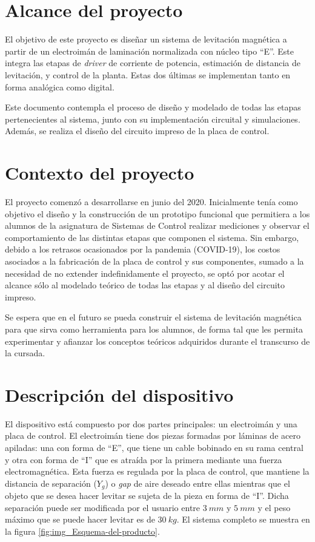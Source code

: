 \section{Alcance del proyecto}

\noindent El objetivo de este proyecto es diseñar un sistema de levitación magnética a partir de un electroimán de laminación normalizada con núcleo tipo “E''. Este integra las etapas de \textsl{driver} de corriente de potencia, estimación de distancia de levitación, y control de la planta. Estas dos últimas se implementan tanto en forma analógica como digital.

\noindent Este documento contempla el proceso de diseño y modelado de todas las etapas pertenecientes al sistema, junto con su implementación circuital y simulaciones. Además, se realiza el diseño del circuito impreso de la placa de control.



\section{Contexto del proyecto}

\noindent El proyecto comenzó a desarrollarse en junio del 2020. Inicialmente tenía como objetivo el diseño y la construcción de un prototipo funcional que permitiera a los alumnos de la asignatura de Sistemas de Control realizar mediciones y observar el comportamiento de las distintas etapas que componen el sistema. Sin embargo, debido a los retrasos ocasionados por la pandemia (COVID-19), los costos asociados a la fabricación de la placa de control y sus componentes, sumado a la  necesidad de no extender indefinidamente el proyecto, se optó por acotar el alcance sólo al modelado teórico de todas las etapas y al diseño del circuito impreso.

\noindent Se espera que en el futuro se pueda construir el sistema de levitación magnética para que sirva como herramienta para los alumnos, de forma tal que les permita experimentar y afianzar los conceptos teóricos adquiridos durante el transcurso de la cursada.



\section{Descripción del dispositivo}

\noindent El dispositivo está compuesto por dos partes principales: un electroimán y una placa de control. El electroimán tiene dos piezas formadas por láminas de acero apiladas: una con forma de “E”, que tiene un cable bobinado en su rama central y otra con forma de “I” que es atraída por la primera mediante una fuerza electromagnética. Esta fuerza es regulada por la placa de control, que mantiene la distancia de separación ($Y_{g}$) o \textsl{gap} de aire deseado entre ellas mientras que el objeto que se desea hacer levitar se sujeta de la pieza en forma de “I”. Dicha separación puede ser modificada por el usuario entre $3\:mm$ y $5\:mm$ y el peso máximo que se puede hacer levitar es de $30\:kg$. El sistema completo se muestra en la figura \ref{fig:img_Esquema-del-producto}.

